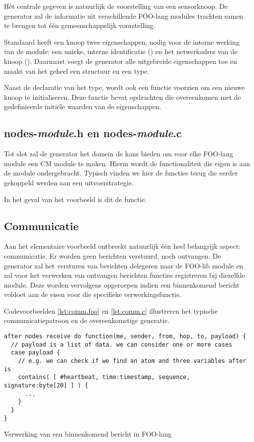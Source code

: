 H\'et centrale gegeven is natuurlijk de voorstelling van een sensorknoop. De
generator zal de informatie uit verschillende FOO-lang modules trachten samen
te brengen tot \'e\'en gemeenschappelijk voorstelling.

Standaard heeft een knoop twee eigenschappen, nodig voor de interne werking van
de  module: een unieke, interne identificatie () en het
netwerkadres van de knoop (). Daarnaast voegt de generator alle
uitgebreide eigenschappen toe en maakt van het geheel een structuur en een
 type.

Naast de declaratie van het type, wordt ook een functie voorzien om een nieuwe
knoop te initialiseren. Deze functie bevat opdrachten die overeenkomen met de
gedefinieerde initi\"ele waarden van de eigenschappen.

\subsection{nodes-\emph{module}.h en nodes-\emph{module}.c}

Tot slot zal de generator het  domein de kans bieden om voor elke
FOO-lang module een CM module te maken. Hierin wordt de functionaliteit die
eigen is aan de module ondergebracht. Typisch vinden we hier de functies terug
die eerder gekoppeld werden aan een uitvoerstrategie.

In het geval van het voorbeeld is dit de  functie.

\subsection{Communicatie}

Aan het elementaire voorbeeld ontbreekt natuurlijk \'e\'en heel belangrijk
aspect: communicatie. Er worden geen berichten verstuurd, noch ontvangen. De
generator zal het versturen van berichten delegeren naar de  FOO-lib
module en zal voor het verwerken van ontvangen berichten functies registreren
bij diezelfde module. Deze worden vervolgens opgeroepen indien een binnenkomend
bericht voldoet aan de eisen voor die specifieke verwerkingsfunctie.

Codevoorbeelden \ref{lst:comm.foo} en \ref{lst:comm.c} illustreren het typische
communicatiepatroon en de overeenkomstige generatie.

\begin{listing}[ht]
  \begin{verbatim}
after nodes receive do function(me, sender, from, hop, to, payload) {
  // payload is a list of data. we can consider one or more cases
  case payload {
    // e.g. we can check if we find an atom and three variables after is
    contains( [ #heartbeat, time:timestamp, sequence, signature:byte[20] ] ) {
      ...
    }
  }
}
  \end{verbatim}
  \vspace{-5mm}
  \caption{Verwerking van een binnenkomend bericht in FOO-lang}
  \label{lst:comm.foo}
\end{listing}

